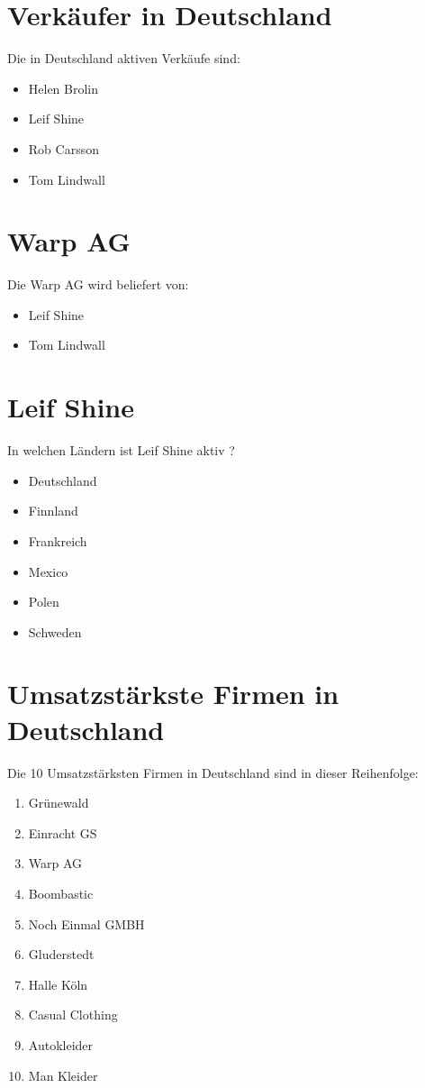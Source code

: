 \documentclass[10pt]{scrartcl}
\author{André Harms, Oliver Steenbuck}
\title{\titletext}
\date{15.11.2012}
\begin{document}
\maketitle

\setcounter{tocdepth}{3}
\tableofcontents

\section{Verkäufer in Deutschland}
Die in Deutschland aktiven Verkäufe sind:
\begin{itemize}
	\item Helen Brolin
	\item Leif Shine
	\item Rob Carsson
	\item Tom Lindwall
\end{itemize}

\section{Warp AG}
Die Warp AG wird beliefert von:
\begin{itemize}
	\item Leif Shine
	\item Tom Lindwall
\end{itemize}

\section{Leif Shine}
In welchen Ländern ist Leif Shine aktiv ?
\begin{itemize}
	\item Deutschland
	\item Finnland
	\item Frankreich
	\item Mexico
	\item Polen
	\item Schweden
\end{itemize}


\section{Umsatzstärkste Firmen in Deutschland}
Die 10 Umsatzstärksten Firmen in Deutschland sind in dieser Reihenfolge:
\begin{enumerate}
	\item Grünewald
	\item Einracht GS
	\item Warp AG
	\item Boombastic
	\item Noch Einmal GMBH
	\item Gluderstedt
	\item Halle Köln
	\item Casual Clothing
	\item Autokleider
	\item Man Kleider
\end{enumerate}
\end{document}
